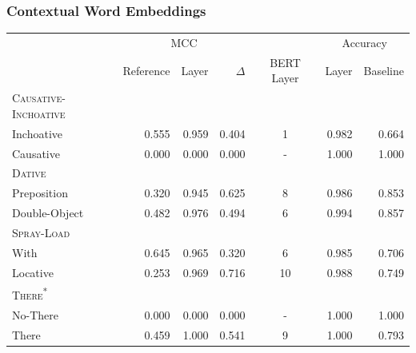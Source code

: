 \documentclass[11pt]{article}
\begin{document}
\subsubsection{Contextual Word Embeddings}

\begin{table}[!h]
\begin{tabular}{lrrrcrr}
\toprule
{} & \multicolumn{3}{c}{MCC} & {} & \multicolumn{2}{c}{Accuracy} \\ \cmidrule(r){2-4} \cmidrule(r){6-7}
{} &  Reference &  Layer &  $\Delta$ &   BERT Layer &  Layer &  Baseline  \\
\midrule
\textsc{Causative-Inchoative} & & & & &  & \\
\hspace{1em}  Inchoative &          0.555 &      0.959 &      0.404 &           1 &     0.982 &              0.664 \\
 \hspace{1em} Causative &          0.000 &      0.000 &      0.000 &           - &     1.000 &              1.000 \\
\textsc{Dative}&          &           &            &           &    &     \\  
\hspace{1em} Preposition &          0.320 &      0.945 &      0.625 &           8 &     0.986 &              0.853 \\
\hspace{1em} Double-Object &          0.482 &      0.976 &      0.494 &           6 &     0.994 &              0.857 \\
\textsc{Spray-Load}&         &       &            &           &       &  \\
\hspace{1em}        With &          0.645 &      0.965 &      0.320 &           6 &     0.985 &              0.706 \\
\hspace{1em}    Locative &          0.253 &      0.969 &      0.716 &          10 &     0.988 &              0.749 \\
\textsc{There\textsuperscript{*}}&         &       &            &           &        & \\
\hspace{1em}    No-There &          0.000 &      0.000 &      0.000 &           - &     1.000 &              1.000 \\
\hspace{1em}       There &          0.459 &      1.000 &      0.541 &           9 &     1.000 &              0.793 \\

\end{tabular}
\end{table}
\end{document}
